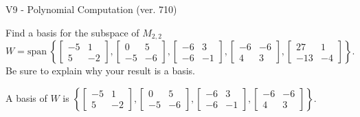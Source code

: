 \begin{exercise}
  \begin{exerciseTitle}V9 - Polynomial Computation (ver. 710)\end{exerciseTitle}
  \begin{exerciseStatement}
    Find a basis for the subspace of \(M_{2,2}\) 
\[W=\mathrm{span}\ \left\{\left[\begin{array}{cc}
-5 & 1 \\
5 & -2
\end{array}\right] , \left[\begin{array}{cc}
0 & 5 \\
-5 & -6
\end{array}\right] , \left[\begin{array}{cc}
-6 & 3 \\
-6 & -1
\end{array}\right] , \left[\begin{array}{cc}
-6 & -6 \\
4 & 3
\end{array}\right] , \left[\begin{array}{cc}
27 & 1 \\
-13 & -4
\end{array}\right]\right\}.\]
 Be sure to explain why your result is a basis.


  \end{exerciseStatement}
  \begin{exerciseAnswer}
   A basis of \(W\) is  \(\left\{\left[\begin{array}{cc}
-5 & 1 \\
5 & -2
\end{array}\right] , \left[\begin{array}{cc}
0 & 5 \\
-5 & -6
\end{array}\right] , \left[\begin{array}{cc}
-6 & 3 \\
-6 & -1
\end{array}\right] , \left[\begin{array}{cc}
-6 & -6 \\
4 & 3
\end{array}\right]\right\}\).
  


  \end{exerciseAnswer}
\end{exercise}